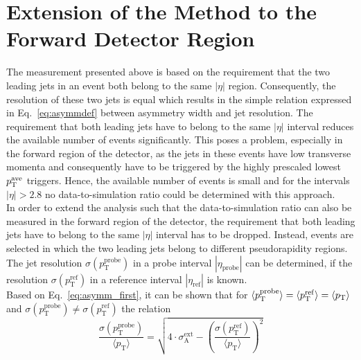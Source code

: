 \section{Extension of the Method to the Forward Detector Region}
\label{sec:jer_forward_extension}
The measurement presented above is based on the requirement that the two leading jets in an event both belong to the same $|\eta|$ region. Consequently, the resolution of these two jets is equal which results in the simple relation expressed in Eq.~\ref{eq:asymmdef} between asymmetry width and jet resolution. The requirement that both leading jets have to belong to the same $|\eta|$ interval reduces the available number of events significantly. This poses a problem, especially in the forward region of the detector, as the jets in these events have low transverse momenta and consequently have to be triggered by the highly prescaled lowest $p_{\text{T}}^\mathrm{ave}$ triggers. Hence, the available number of events is small and for the intervals $|\eta| > 2.8$ no data-to-simulation ratio could be determined with this approach. \\
In order to extend the analysis such that the data-to-simulation ratio can also be measured in the forward region of the detector, the requirement that both leading jets have to belong to the same $|\eta|$ interval has to be dropped. Instead, events are selected in which the two leading jets belong to different pseudorapidity regions. The jet resolution $\sigma (p_\mathrm{T}^{\mathrm{probe}})$ in a probe interval $|\eta_\mathrm{probe}|$ can be determined, if the resolution $\sigma (p_\mathrm{T}^{\mathrm{ref}})$ in a reference interval $|\eta_\mathrm{ref}|$ is known. \\
Based on Eq.~\ref{eq:asymm_first}, it can be shown that for $\langle p^\mathrm{probe}_\mathrm{T} \rangle = \langle p^\mathrm{ref}_\mathrm{T} \rangle = \langle p_{\text{T}} \rangle$ and $\sigma (p_\mathrm{T}^{\mathrm{probe}}) \neq \sigma (p_\mathrm{T}^{\mathrm{ref}})$ the relation
\begin{equation}
 \label{eq:asymm_forward}
  \frac{\sigma (p^\mathrm{probe}_\mathrm{T})}{\langle p_\mathrm{T} \rangle} = \sqrt{4 \cdot \sigma_\mathrm{A}^\mathrm{ext} - \left(\frac{\sigma (p^\mathrm{ref}_\mathrm{T})}{\langle p_\mathrm{T} \rangle} \right)^2} 
 \end{equation}
